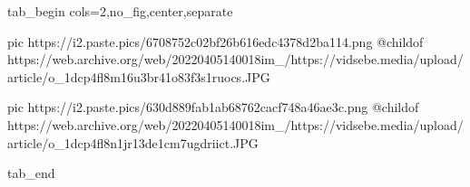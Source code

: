  
 
 
 
 


\ifcmt
  tab_begin cols=2,no_fig,center,separate

     pic https://i2.paste.pics/6708752c02bf26b616edc4378d2ba114.png
		 @childof https://web.archive.org/web/20220405140018im_/https://vidsebe.media/upload/article/o_1dcp4fl8m16u3br41o83f3s1ruocs.JPG

		 pic https://i2.paste.pics/630d889fab1ab68762cacf748a46ae3c.png
		 @childof https://web.archive.org/web/20220405140018im_/https://vidsebe.media/upload/article/o_1dcp4fl8n1jr13de1cm7ugdriict.JPG

  tab_end
\fi
